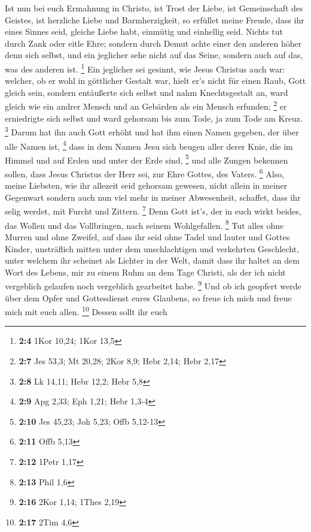  Ist nun bei euch Ermahnung in Christo, ist Trost der Liebe,
ist Gemeinschaft des Geistes, ist herzliche Liebe und Barmherzigkeit,
 so erfüllet meine Freude, dass ihr eines Sinnes seid,
gleiche Liebe habt, einmütig und einhellig seid.  Nichts tut
durch Zank oder eitle Ehre; sondern durch Demut achte einer den anderen
höher denn sich selbst,  und ein jeglicher sehe nicht auf
das Seine, sondern auch auf das, was des anderen ist. \footnote{\textbf{2:4}
  1Kor 10,24; 1Kor 13,5}  Ein jeglicher sei gesinnt, wie
Jesus Christus auch war:  welcher, ob er wohl in göttlicher
Gestalt war, hielt er's nicht für einen Raub, Gott gleich sein,
 sondern entäußerte sich selbst und nahm Knechtsgestalt an,
ward gleich wie ein andrer Mensch und an Gebärden als ein Mensch
erfunden; \footnote{\textbf{2:7} Jes 53,3; Mt 20,28; 2Kor 8,9; Hebr
  2,14; Hebr 2,17}  er erniedrigte sich selbst und ward
gehorsam bis zum Tode, ja zum Tode am Kreuz. \footnote{\textbf{2:8} Lk
  14,11; Hebr 12,2; Hebr 5,8}  Darum hat ihn auch Gott
erhöht und hat ihm einen Namen gegeben, der über alle Namen ist,
\footnote{\textbf{2:9} Apg 2,33; Eph 1,21; Hebr 1,3-4} 
dass in dem Namen Jesu sich beugen aller derer Knie, die im Himmel und
auf Erden und unter der Erde sind, \footnote{\textbf{2:10} Jes 45,23;
  Joh 5,23; Offb 5,12-13}  und alle Zungen bekennen sollen,
dass Jesus Christus der Herr sei, zur Ehre Gottes, des Vaters.
\footnote{\textbf{2:11} Offb 5,13}  Also, meine Liebsten,
wie ihr allezeit seid gehorsam gewesen, nicht allein in meiner Gegenwart
sondern auch nun viel mehr in meiner Abwesenheit, schaffet, dass ihr
selig werdet, mit Furcht und Zittern. \footnote{\textbf{2:12} 1Petr 1,17}
 Denn Gott ist's, der in euch wirkt beides, das Wollen und
das Vollbringen, nach seinem Wohlgefallen. \footnote{\textbf{2:13} Phil
  1,6}  Tut alles ohne Murren und ohne Zweifel,
 auf dass ihr seid ohne Tadel und lauter und Gottes Kinder,
unsträflich mitten unter dem unschlachtigen und verkehrten Geschlecht,
unter welchem ihr scheinet als Lichter in der Welt,  damit
dass ihr haltet an dem Wort des Lebens, mir zu einem Ruhm an dem Tage
Christi, als der ich nicht vergeblich gelaufen noch vergeblich
gearbeitet habe. \footnote{\textbf{2:16} 2Kor 1,14; 1Thes 2,19}
 Und ob ich geopfert werde über dem Opfer und Gottesdienst
eures Glaubens, so freue ich mich und freue mich mit euch allen.
\footnote{\textbf{2:17} 2Tim 4,6}  Dessen sollt ihr euch
